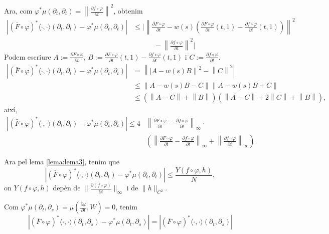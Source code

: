 {Ara, com $\varphi^*\mu(\partial_t,\partial_t) = \left\| \frac{\partial f\circ\varphi}{\partial t} \right\|^2$, obtenim
\begin{align*}
    |(\bar F\circ\varphi)^*\langle\cdot,\cdot\rangle(\partial_t, \partial_t) - \varphi^*\mu(\partial_t, \partial_t)| &\le 
    \Bigg|\left\|\frac{\partial F\circ\varphi}{\partial t}-w(s)\left(\frac{\partial F\circ\varphi}{\partial t}(t,1) - \frac{\partial f\circ\varphi}{\partial t}(t,1)\right)\right\|^2 \\&\quad\quad\quad- \left\| \frac{\partial f\circ\varphi}{\partial t} \right\|^2\Bigg|
\end{align*}
Podem escriure $A:=\frac{\partial F\circ\varphi}{\partial t}$, $B:=\frac{\partial F\circ \varphi}{\partial t}(t,1) - \frac{\partial f\circ\varphi}{\partial t}(t,1)$ i $C:=\frac{\partial f\circ\varphi}{\partial t}$.
\begin{align*}
    |(\bar F\circ\varphi)^*\langle\cdot,\cdot\rangle(\partial_t, \partial_t) - \varphi^*\mu(\partial_t, \partial_t)| 
    &=
    \left\|\left|A-w(s)B\right\|^2 - \left\|C\right\|^2\right|
    \\&\le
    \left\|A-w(s)B - C\right\|\left\|A-w(s)B + C\right\|
    \\&\le
    (\left\|A - C\right\| + \left\|B\right\|)(\left\|A-C\right\| + 2\left\|C\right\|+\left\|B\right\|),
\end{align*}
així,
\begin{align*}
    |(\bar F\circ\varphi)^*\langle\cdot,\cdot\rangle(\partial_t, \partial_t) - \varphi^*\mu(\partial_t, \partial_t)| \le 
    4&\left\|\frac{\partial F\circ\varphi}{\partial t}-\frac{\partial f\circ\varphi}{\partial t}\right\|_\infty\cdot\\
    &\left(\left\|\frac{\partial F\circ\varphi}{\partial t}-\frac{\partial f\circ\varphi}{\partial t}\right\|_\infty+\left\|\frac{\partial f\circ\varphi}{\partial t}\right\|_\infty\right).
\end{align*}

Ara pel lema \ref{lema:lema3}, tenim que 
\begin{equation}\label{eq:Y}
    \left|(\bar F\circ\varphi)^*\langle\cdot,\cdot\rangle(\partial_t, \partial_t) - \varphi^*\mu(\partial_t, \partial_t)\right|\le\frac{Y(f\circ\varphi,h)}{N},
\end{equation}
on $Y(f\circ\varphi,h)$ depèn de $\|\frac{\partial(f\circ\varphi)}{\partial t}\|_\infty$ i de $\|h\|_{C^2}$.

Com $\varphi^*\mu(\partial_t,\partial_s) = \mu(\frac{\partial\varphi}{\partial t}, W)=0$, tenim
\begin{equation*}
    \left|(\bar F\circ\varphi)^*\langle\cdot,\cdot\rangle(\partial_t, \partial_s) - \varphi^*\mu(\partial_t, \partial_s)\right| = \left| (\bar F\circ\varphi)^*\langle\cdot,\cdot\rangle(\partial_t, \partial_s) \right|
\end{equation*}

}
